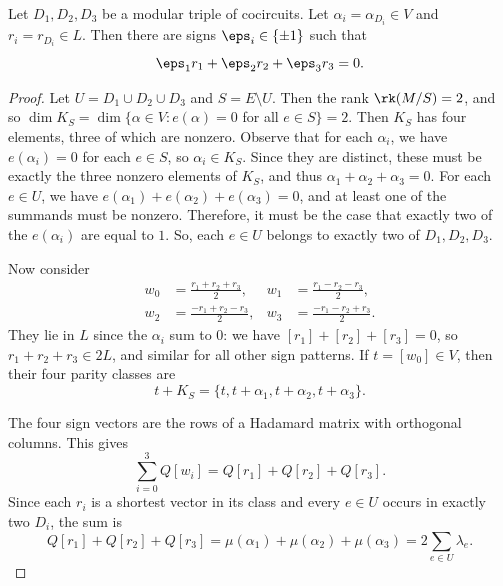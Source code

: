 \documentclass[11pt,letterpaper]{amsart}
\begin{document}
\begin{theorem}\label{thm:metric-modular-triple}
Let $D_1,D_2,D_3$ be a modular triple of cocircuits.  Let $\alpha_i=\alpha_{D_i}\in V$ and $r_i=r_{D_i}\in L.$ Then there are signs $\eps_i\in\{\pm1\}$ such that
\begin{equation*}
  \eps_1r_1+\eps_2r_2+\eps_3r_3=0.
\end{equation*}
\end{theorem}
\begin{proof}
     Let $U = D_1 \cup D_2 \cup D_3$ and $S = E \setminus U$. Then the rank $\rk(M/S) = 2$, and so $\dim K_S = \dim\{\alpha \in V: e(\alpha) = 0$ for all  $e \in S\} = 2$. Then $K_S$ has four elements, three of which are nonzero. Observe that for each $\alpha_i$, we have $e(\alpha_i) = 0$ for each $e \in S$, so $\alpha_i \in K_S$. Since they are distinct, these must be exactly the three nonzero elements of $K_S$, and thus $\alpha_1 + \alpha_2 + \alpha_3 = 0$. For each $e \in U$, we have $e(\alpha_1) + e(\alpha_2) + e(\alpha_3) = 0$, and at least one of the summands must be nonzero. Therefore, it must be the case that exactly two of the $e(\alpha_i)$ are equal to $1$. So, each $e \in U$ belongs to exactly two of $D_1, D_2, D_3$.

    Now consider 
    \begin{equation*}
\begin{aligned}
  w_0&=\frac{r_1+r_2+r_3}{2},&
  w_1&=\frac{r_1-r_2-r_3}{2},\\
  w_2&=\frac{-r_1+r_2-r_3}{2},&
  w_3&=\frac{-r_1-r_2+r_3}{2}.
\end{aligned}
\end{equation*}
They lie in $L$ since the $\alpha_i$ sum to $0$: we have $[r_1] + [r_2]+[r_3] = 0$, so $r_1+r_2+r_3 \in 2L$, and similar for all other sign patterns. If $t=[w_0]\in V$, then their four parity classes are
\[
  t+K_S=\{t,t+\alpha_1,t+\alpha_2,t+\alpha_3\}.
\]

The four sign vectors are the rows of a Hadamard matrix with orthogonal columns. This gives 
\begin{equation*}
  \sum_{i=0}^3Q[w_i]
  =Q[r_1]+Q[r_2]+Q[r_3].
\end{equation*}
Since each $r_i$ is a shortest vector in its class and every $e\in U$ occurs in exactly two $D_i$, the sum is
\begin{equation*}
  Q[r_1]+Q[r_2]+Q[r_3]
  =\mu(\alpha_1)+\mu(\alpha_2)+\mu(\alpha_3)
  =2\sum_{e\in U}\lambda_e.
\end{equation*}


\end{proof}
\end{document}
